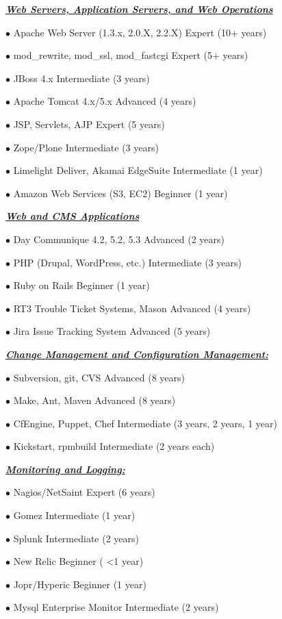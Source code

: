 \documentclass{article}
\newcommand{\skillset}[1]{{ \underline{\textbf{\emph{#1}}}\\  \nopagebreak }}
\newcommand{\skill}[2]{{$\bullet$ #1 \hfill #2 }}
\begin{document}
\skillset{Web Servers, Application Servers, and Web Operations}

\skill{Apache Web Server (1.3.x, 2.0.X, 2.2.X)}{Expert (10+ years)}

\skill{mod\_rewrite, mod\_ssl, mod\_fastcgi}{Expert (5+ years)}

\skill{JBoss 4.x}{Intermediate (3 years)}

\skill{Apache Tomcat 4.x/5.x}{Advanced (4 years)}

\skill{JSP, Servlets, AJP}{Expert (5 years)}

\skill{Zope/Plone}{Intermediate (3 years)}

\skill{Limelight Deliver, Akamai EdgeSuite}{Intermediate (1 year)}

\skill{Amazon Web Services (S3, EC2)}{Beginner (1 year)}



\skillset{Web and CMS Applications}

\skill{Day Communique 4.2, 5.2, 5.3}{Advanced (2 years)}

\skill{PHP (Drupal, WordPress, etc.)}{Intermediate (3 years)}

\skill{Ruby on Rails}{Beginner (1 year)}

\skill{RT3 Trouble Ticket Systems, Mason}{Advanced (4 years)}

\skill{Jira Issue Tracking System}{Advanced (5 years)}



\skillset{Change Management and Configuration Management: }

\skill{Subversion, git, CVS}{Advanced (8 years)}

\skill{Make, Ant, Maven}{Advanced (8 years)}

\skill{CfEngine, Puppet, Chef}{Intermediate (3 years, 2 years, 1 year)}

\skill{Kickstart, rpmbuild}{Intermediate (2 years each)}



\skillset{Monitoring and Logging: }

\skill{Nagios/NetSaint}{Expert (6 years)}

\skill{Gomez}{Intermediate (1 year)}

\skill{Splunk}{Intermediate (2 years)}

\skill{New Relic}{Beginner ( \textless 1 year)}

\skill{Jopr/Hyperic}{Beginner (1 year)}

\skill{Mysql Enterprise Monitor}{Intermediate (2 years)}
\end{document}
